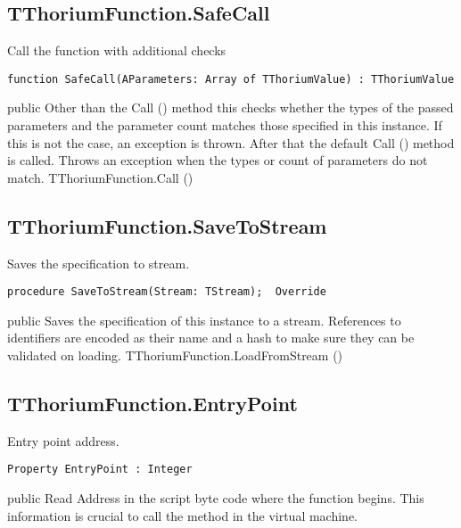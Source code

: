 \subsection{TThoriumFunction.SafeCall}
\label{thoriumcorepkg:thorium:tthoriumfunction:safecall}
\begin{FPCList}
\Synopsis
Call the function with additional checks\Declaration 

\begin{verbatim}
function SafeCall(AParameters: Array of TThoriumValue) : TThoriumValue
\end{verbatim}
\Visibility
public
\Description
Other than the Call (\pageref{thoriumcorepkg:thorium:tthoriumfunction:call}) method this checks whether the types of the passed parameters and the parameter count matches those specified in this instance. If this is not the case, an exception is thrown. After that the default Call (\pageref{thoriumcorepkg:thorium:tthoriumfunction:call}) method is called.\Errors
Throws an exception when the types or count of parameters do not match.\SeeAlso
TThoriumFunction.Call (\pageref{thoriumcorepkg:thorium:tthoriumfunction:call})\end{FPCList}
\subsection{TThoriumFunction.SaveToStream}
\label{thoriumcorepkg:thorium:tthoriumfunction:savetostream}
\begin{FPCList}
\Synopsis
Saves the specification to stream.\Declaration 

\begin{verbatim}
procedure SaveToStream(Stream: TStream);  Override
\end{verbatim}
\Visibility
public
\Description
Saves the specification of this instance to a stream. References to identifiers are encoded as their name and a hash to make sure they can be validated on loading.\SeeAlso
TThoriumFunction.LoadFromStream (\pageref{thoriumcorepkg:thorium:tthoriumfunction:loadfromstream})\end{FPCList}
\subsection{TThoriumFunction.EntryPoint}
\label{thoriumcorepkg:thorium:tthoriumfunction:entrypoint}
\begin{FPCList}
\Synopsis
Entry point address.\Declaration 

\begin{verbatim}
Property EntryPoint : Integer
\end{verbatim}
\Visibility
public
\Access
Read
\Description
Address in the script byte code where the function begins. This information is crucial to call the method in the virtual machine.\end{FPCList}
